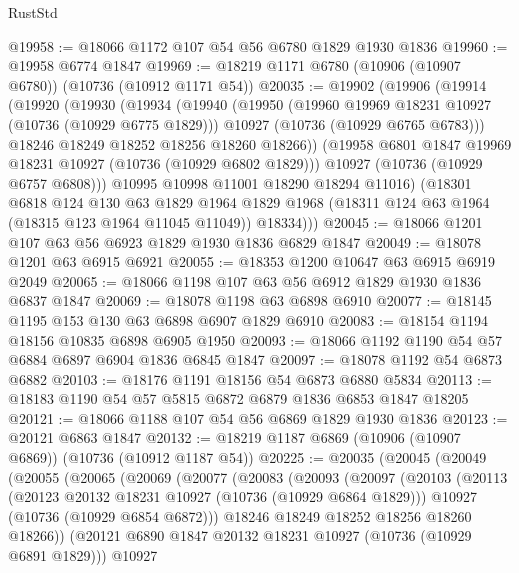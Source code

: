 \begin{lexlean}{RustStd}
\begin{coremodule}
@19958 := @18066 @1172 @107 @54 @56 @6780 @1829 @1930 @1836
@19960 := @19958 @6774 @1847
@19969 := @18219 @1171 @6780 (@10906 (@10907 @6780)) (@10736 (@10912 @1171 @54))
@20035 := @19902
    (@19906
      (@19914
        (@19920
          (@19930
            (@19934
              (@19940
                (@19950
                  (@19960 @19969 @18231 @10927 (@10736 (@10929 @6775 @1829)))
                  @10927
                  (@10736 (@10929 @6765 @6783)))
                @18246
                @18249
                @18252
                @18256
                @18260
                @18266))
            (@19958 @6801 @1847 @19969 @18231 @10927 (@10736 (@10929 @6802 @1829)))
            @10927
            (@10736 (@10929 @6757 @6808)))
          @10995
          @10998
          @11001
          @18290
          @18294
          @11016)
        (@18301
          @6818
          @124
          @130
          @63
          @1829
          @1964
          @1829
          @1968
          (@18311 @124 @63 @1964 (@18315 @123 @1964 @11045 @11049))
          @18334)))
@20045 := @18066 @1201 @107 @63 @56 @6923 @1829 @1930 @1836 @6829 @1847
@20049 := @18078 @1201 @63 @6915 @6921
@20055 := @18353 @1200 @10647 @63 @6915 @6919 @2049
@20065 := @18066 @1198 @107 @63 @56 @6912 @1829 @1930 @1836 @6837 @1847
@20069 := @18078 @1198 @63 @6898 @6910
@20077 := @18145 @1195 @153 @130 @63 @6898 @6907 @1829 @6910
@20083 := @18154 @1194 @18156 @10835 @6898 @6905 @1950
@20093 := @18066 @1192 @1190 @54 @57 @6884 @6897 @6904 @1836 @6845 @1847
@20097 := @18078 @1192 @54 @6873 @6882
@20103 := @18176 @1191 @18156 @54 @6873 @6880 @5834
@20113 := @18183 @1190 @54 @57 @5815 @6872 @6879 @1836 @6853 @1847 @18205
@20121 := @18066 @1188 @107 @54 @56 @6869 @1829 @1930 @1836
@20123 := @20121 @6863 @1847
@20132 := @18219 @1187 @6869 (@10906 (@10907 @6869)) (@10736 (@10912 @1187 @54))
@20225 := @20035
    (@20045
      (@20049
        (@20055
          (@20065
            (@20069
              (@20077
                (@20083
                  (@20093
                    (@20097
                      (@20103
                        (@20113
                          (@20123 @20132 @18231 @10927 (@10736 (@10929 @6864 @1829)))
                          @10927
                          (@10736 (@10929 @6854 @6872)))
                        @18246
                        @18249
                        @18252
                        @18256
                        @18260
                        @18266))
                    (@20121 @6890 @1847 @20132 @18231 @10927 (@10736 (@10929 @6891 @1829)))
                    @10927

\end{coremodule}
\end{lexlean}
